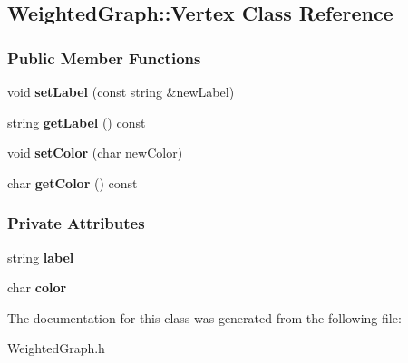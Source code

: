 \hypertarget{class_weighted_graph_1_1_vertex}{}\subsection{Weighted\+Graph\+:\+:Vertex Class Reference}
\label{class_weighted_graph_1_1_vertex}
\subsubsection*{Public Member Functions}
\begin{DoxyCompactItemize}
\item 
void {\bfseries set\+Label} (const string \&new\+Label)\hypertarget{class_weighted_graph_1_1_vertex_afeacbff508350a8d2142369cc0ee09ba}{}\label{class_weighted_graph_1_1_vertex_afeacbff508350a8d2142369cc0ee09ba}

\item 
string {\bfseries get\+Label} () const \hypertarget{class_weighted_graph_1_1_vertex_a09bc4b28b77ed88f70df2438eecb1990}{}\label{class_weighted_graph_1_1_vertex_a09bc4b28b77ed88f70df2438eecb1990}

\item 
void {\bfseries set\+Color} (char new\+Color)\hypertarget{class_weighted_graph_1_1_vertex_ac4fcd685324729f5956640cad824caad}{}\label{class_weighted_graph_1_1_vertex_ac4fcd685324729f5956640cad824caad}

\item 
char {\bfseries get\+Color} () const \hypertarget{class_weighted_graph_1_1_vertex_a4b10c5c1a23bc100385c33b9a40a65eb}{}\label{class_weighted_graph_1_1_vertex_a4b10c5c1a23bc100385c33b9a40a65eb}

\end{DoxyCompactItemize}
\subsubsection*{Private Attributes}
\begin{DoxyCompactItemize}
\item 
string {\bfseries label}\hypertarget{class_weighted_graph_1_1_vertex_a9653450774bc621cac91b9a403f4062e}{}\label{class_weighted_graph_1_1_vertex_a9653450774bc621cac91b9a403f4062e}

\item 
char {\bfseries color}\hypertarget{class_weighted_graph_1_1_vertex_a56942930088e9bdf0d8a79138ccc679c}{}\label{class_weighted_graph_1_1_vertex_a56942930088e9bdf0d8a79138ccc679c}

\end{DoxyCompactItemize}


The documentation for this class was generated from the following file\+:\begin{DoxyCompactItemize}
\item 
Weighted\+Graph.\+h\end{DoxyCompactItemize}
